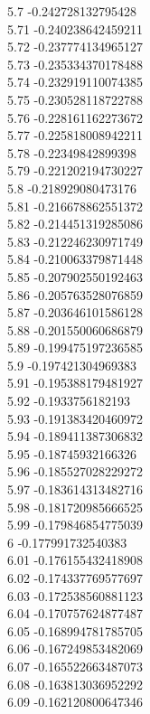 {5.7	-0.242728132795428\\
5.71	-0.240238642459211\\
5.72	-0.237774134965127\\
5.73	-0.235334370178488\\
5.74	-0.232919110074385\\
5.75	-0.230528118722788\\
5.76	-0.228161162273672\\
5.77	-0.225818008942211\\
5.78	-0.22349842899398\\
5.79	-0.221202194730227\\
5.8	-0.218929080473176\\
5.81	-0.216678862551372\\
5.82	-0.214451319285086\\
5.83	-0.212246230971749\\
5.84	-0.210063379871448\\
5.85	-0.207902550192463\\
5.86	-0.205763528076859\\
5.87	-0.203646101586128\\
5.88	-0.201550060686879\\
5.89	-0.199475197236585\\
5.9	-0.197421304969383\\
5.91	-0.195388179481927\\
5.92	-0.1933756182193\\
5.93	-0.191383420460972\\
5.94	-0.189411387306832\\
5.95	-0.18745932166326\\
5.96	-0.185527028229272\\
5.97	-0.183614313482716\\
5.98	-0.181720985666525\\
5.99	-0.179846854775039\\
6	-0.177991732540383\\
6.01	-0.176155432418908\\
6.02	-0.174337769577697\\
6.03	-0.172538560881123\\
6.04	-0.170757624877487\\
6.05	-0.168994781785705\\
6.06	-0.167249853482069\\
6.07	-0.165522663487073\\
6.08	-0.163813036952292\\
6.09	-0.162120800647346\\
}
